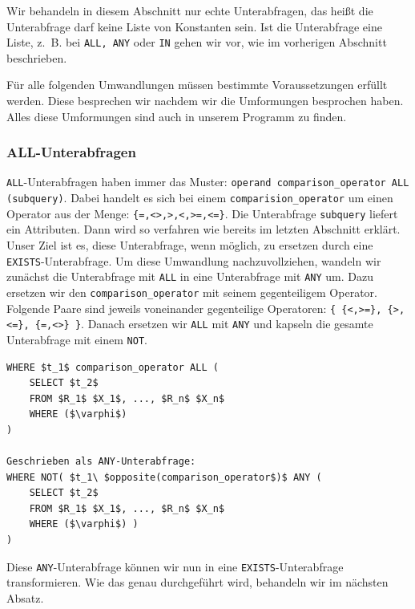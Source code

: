 Wir behandeln in diesem Abschnitt nur echte Unterabfragen, das heißt die Unterabfrage darf keine Liste von Konstanten sein. Ist die Unterabfrage eine Liste, \mbox{z. B.} bei \verb|ALL, ANY| oder \verb|IN| gehen wir vor, wie im vorherigen Abschnitt beschrieben.

Für alle folgenden Umwandlungen müssen bestimmte Voraussetzungen erfüllt werden. Diese besprechen wir nachdem wir die Umformungen besprochen haben. Alles diese Umformungen sind auch in unserem Programm zu finden.

\subsubsection*{ALL-Unterabfragen}

\verb|ALL|-Unterabfragen haben immer das Muster: \verb|operand comparison_operator ALL (subquery)|. Dabei handelt es sich bei einem \verb|comparision_operator| um einen Operator aus der Menge: \verb|{=,<>,>,<,>=,<=}|. Die Unterabfrage \verb|subquery| liefert ein Attributen. Dann wird so verfahren wie bereits im letzten Abschnitt erklärt. Unser Ziel ist es, diese Unterabfrage, wenn möglich, zu ersetzen durch eine \verb|EXISTS|-Unterabfrage. Um diese Umwandlung nachzuvollziehen, wandeln wir zunächst die Unterabfrage mit \verb|ALL| in eine Unterabfrage mit \verb|ANY| um. Dazu ersetzen wir den \verb|comparison_operator| mit seinem gegenteiligem Operator. Folgende Paare sind jeweils voneinander gegenteilige Operatoren: \verb|{ {<,>=}, {>,<=}, {=,<>} }|. Danach ersetzen wir \verb|ALL| mit \verb|ANY| und kapseln die gesamte Unterabfrage mit einem \verb|NOT|. 

\begin{lstlisting}[mathescape]
WHERE $t_1$ comparison_operator ALL (
	SELECT $t_2$
	FROM $R_1$ $X_1$, ..., $R_n$ $X_n$
	WHERE ($\varphi$)
)

Geschrieben als ANY-Unterabfrage:
WHERE NOT( $t_1\ $opposite(comparison_operator$)$ ANY (
	SELECT $t_2$
	FROM $R_1$ $X_1$, ..., $R_n$ $X_n$
	WHERE ($\varphi$) ) 
)
\end{lstlisting}

Diese \verb|ANY|-Unterabfrage können wir nun in eine \verb|EXISTS|-Unterabfrage transformieren. Wie das genau durchgeführt wird, behandeln wir im nächsten Absatz.


